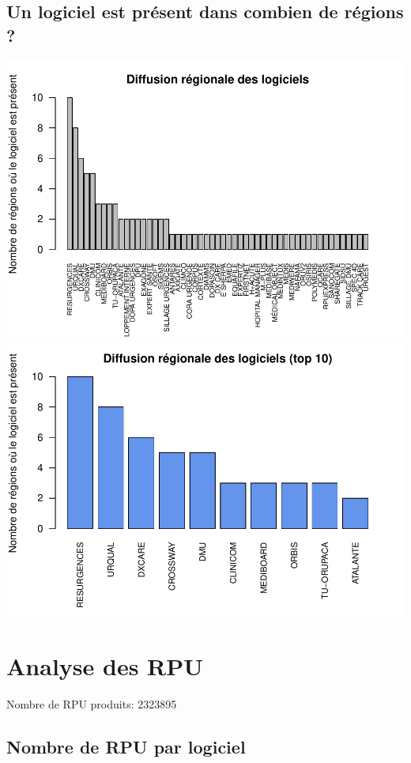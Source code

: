 \documentclass[]{article}
\begin{document}
\subsection{Un logiciel est présent dans combien de régions
?}\label{un-logiciel-est-present-dans-combien-de-regions}

\includegraphics{septembre2015_files/figure-latex/unnamed-chunk-14-1.pdf}
\includegraphics{septembre2015_files/figure-latex/unnamed-chunk-14-2.pdf}

\section{Analyse des RPU}\label{analyse-des-rpu}

Nombre de RPU produits: 2323895

\subsection{Nombre de RPU par
logiciel}\label{nombre-de-rpu-par-logiciel}
\end{document}
